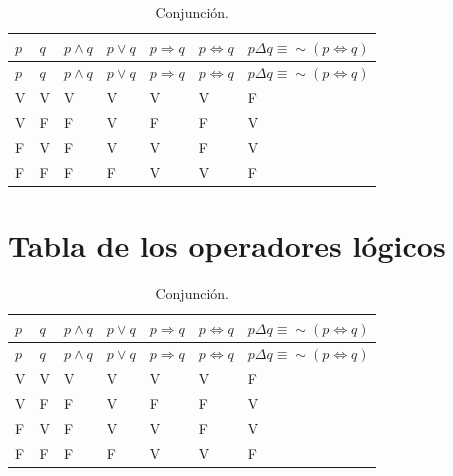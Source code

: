 \documentclass[
  16pt,
]{krantz}
\theoremstyle{definition}
\theoremstyle{definition}
\theoremstyle{definition}
\theoremstyle{definition}
\theoremstyle{remark}
\begin{document}
\begin{longtable}[]{@{}
  >{\raggedright\arraybackslash}p{}
  >{\raggedright\arraybackslash}p{}
  >{\raggedleft\arraybackslash}p{}
  >{\raggedleft\arraybackslash}p{}
  >{\raggedleft\arraybackslash}p{}
  >{\raggedleft\arraybackslash}p{}
  >{\raggedleft\arraybackslash}p{}@{}}
\caption{\label{tab:ww} Conjunción.}\tabularnewline
\toprule
\(p\) & \(q\) & \(p\wedge q\) & \(p\vee q\) & \(p\Longrightarrow q\) & \(p\Longleftrightarrow q\) & \(p\Delta q\equiv \sim (p\Longleftrightarrow q)\) \\
\midrule
\endfirsthead
\toprule
\(p\) & \(q\) & \(p\wedge q\) & \(p\vee q\) & \(p\Longrightarrow q\) & \(p\Longleftrightarrow q\) & \(p\Delta q\equiv \sim (p\Longleftrightarrow q)\) \\
\midrule
\endhead
V & V & V & V & V & V & F \\
V & F & F & V & F & F & V \\
F & V & F & V & V & F & V \\
F & F & F & F & V & V & F \\
\bottomrule
\end{longtable}

\hypertarget{tabla-de-los-operadores-luxf3gicos-1}{%
\section{Tabla de los operadores lógicos}\label{tabla-de-los-operadores-luxf3gicos-1}}

\begin{longtable}[]{@{}
  >{\raggedright\arraybackslash}p{}
  >{\raggedright\arraybackslash}p{}
  >{\raggedright\arraybackslash}p{}
  >{\raggedright\arraybackslash}p{}
  >{\raggedright\arraybackslash}p{}
  >{\raggedright\arraybackslash}p{}
  >{\raggedright\arraybackslash}p{}@{}}
\caption{\label{tab:www} Conjunción.}\tabularnewline
\toprule
\(p\) & \(q\) & \(p\wedge q\) & \(p\vee q\) & \(p\Longrightarrow q\) & \(p\Longleftrightarrow q\) & \(p\Delta q\equiv \sim (p\Longleftrightarrow q)\) \\
\midrule
\endfirsthead
\toprule
\(p\) & \(q\) & \(p\wedge q\) & \(p\vee q\) & \(p\Longrightarrow q\) & \(p\Longleftrightarrow q\) & \(p\Delta q\equiv \sim (p\Longleftrightarrow q)\) \\
\midrule
\endhead
V & V & V & V & V & V & F \\
V & F & F & V & F & F & V \\
F & V & F & V & V & F & V \\
F & F & F & F & V & V & F \\
\bottomrule
\end{longtable}
\end{document}

